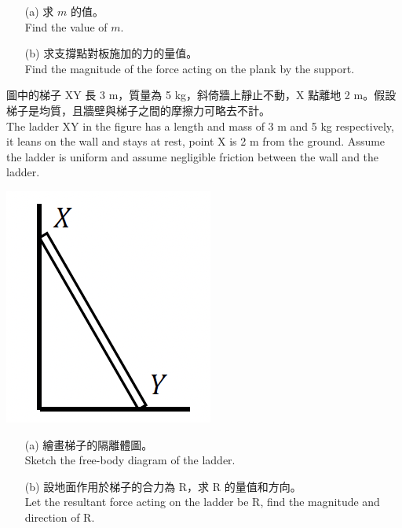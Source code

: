\documentclass[beamer=true]{standalone}
\begin{document}
\begin{eg}
    \begin{itemize}
        \item [(a)] 求 $m$ 的值。 \\Find the value of $m$.
    \end{itemize}
\end{eg}

\begin{eg}
    \begin{itemize}
        \item [(b)]求支撐點對板施加的力的量值。 \\Find the magnitude of the force acting on the plank by the support.
    \end{itemize}
\end{eg}

\begin{eg}
    圖中的梯子 XY 長 3 m，質量為 5 kg，斜倚牆上靜止不動，X 點離地 2 m。假設梯子是均質，且牆壁與梯子之間的摩擦力可略去不計。\\The ladder XY in the figure has a length and mass of 3 m and 5 kg respectively, it leans on the wall and stays at rest, point X is 2 m from the ground. Assume the ladder is uniform and assume negligible friction between the wall and the ladder.
        {\par\centering
            \includegraphics[width=.25\textwidth]{assets/0ba0e131.png}
            \par}
    \begin{itemize}
        \item [(a)] 繪畫梯子的隔離體圖。\\Sketch the free-body diagram of the ladder.
    \end{itemize}
\end{eg}
\begin{eg}
    \begin{itemize}
        \item [(b)] 設地面作用於梯子的合力為 R，求 R 的量值和方向。\\Let the resultant force acting on the ladder be R, find the magnitude and direction of R.
    \end{itemize}
\end{eg}
\end{document}
